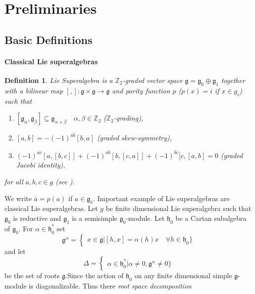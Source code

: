\documentclass[english]{elsarticle}
\newtheorem{definition}{Definition}[section]
\numberwithin{equation}{section}
\begin{document}
\section{Preliminaries}
\label{sec:headings}
\subsection{Basic Definitions}

\paragraph{Classical Lie superalgebras}

\begin{definition}  {\it Lie Superalgebra} is a $\mathbb{Z}_2$-graded vector space $\mathfrak{g}=\mathfrak{g}_0\oplus \mathfrak{g}_1$ together with a bilinear map $[,]:\mathfrak{g}\times \mathfrak{g} \rightarrow \mathfrak{g}$ and parity function $p$ ($p(x) = i$ if $x \in g_i$) such that
\begin{enumerate}
    \item $[\mathfrak{g}_\alpha,\mathfrak{g}_\beta]\subseteq \mathfrak{g}_{\alpha+\beta} \quad  \alpha, \beta \in \mathbb{Z}_2$ \quad ($\mathbb{Z}_2$-grading),
    \item $[a,b]=-(-1)^{\bar{a}\bar{b}}[b,a]$ \quad (graded skew-symmetry),
    \item $(-1)^{\bar{a}\bar{c}}[a,[b,c]]+(-1)^{\bar{a}\bar{b}}[b,[c,a]]+(-1)^{\bar{b}\bar{c}}[c,[a,b]=0$ \quad (graded Jacobi identity),
\end{enumerate}
for all $a,b,c \in g$ (see \cite{Musson}).
\end{definition}
We write $\bar{a}=p(a)$ if $a \in \mathfrak{g}_{\bar{a}}$.
Important example of Lie superalgebras are classical Lie superalgebras. Let $g$ be finite dimensional Lie superalgebra such that $\mathfrak{g}_0$ is reductive and $\mathfrak{g}_1$ is a semisimple $\mathfrak{g}_0$-module. Let $\mathfrak{h}_0$ be a Cartan subalgebra of $\mathfrak{g}_0$. For $\alpha \in \mathfrak{h}_{0}^{\ast}$ set
\[
\mathfrak{g}^{\alpha}=
\begin{cases}
x \in \mathfrak{g}|[h,x]=\alpha(h)x\quad \forall h \in \mathfrak{h}_0\}
\end{cases}
\]
and let
\[
\Delta=
\begin{cases}
\alpha \in \mathfrak{h}_0^{\ast}|\alpha \neq 0,\mathfrak{g}^{\alpha} \neq 0\}
\end{cases}
\]
be the set of roots $\mathfrak{g}$.Since the action of $\mathfrak{h}_0$ on any finite dimensional simple $\mathfrak{g}$-module is diagonalizable. Thus there {\it root space decomposition}
\end{document}
